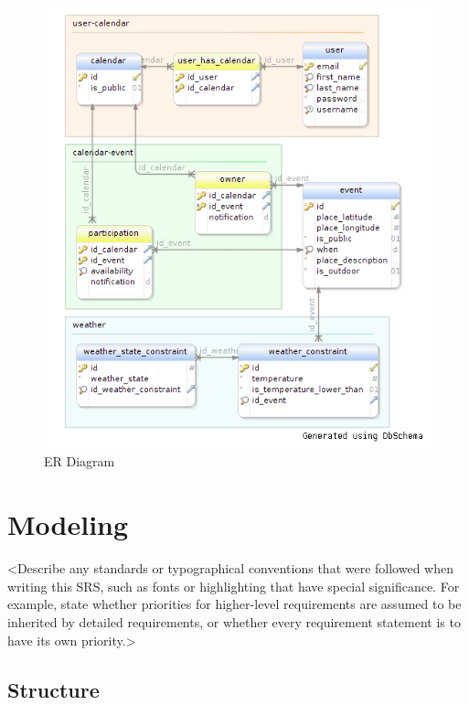 \begin{center}
 \begin{figure}[H]
    \includegraphics[width=1\textwidth]{../ERDiagram/er/er.png}
    \caption{ER Diagram}
     \label{fig:er}
     \end{figure}
   \end{center}  
\section{Modeling}
<Describe any standards or typographical conventions that were followed when writing this SRS, such as fonts or highlighting that have special significance. For example, state whether priorities  for higher-level requirements are assumed to be inherited by detailed requirements, or whether every requirement statement is to have its own priority.>

\subsection{Structure}

